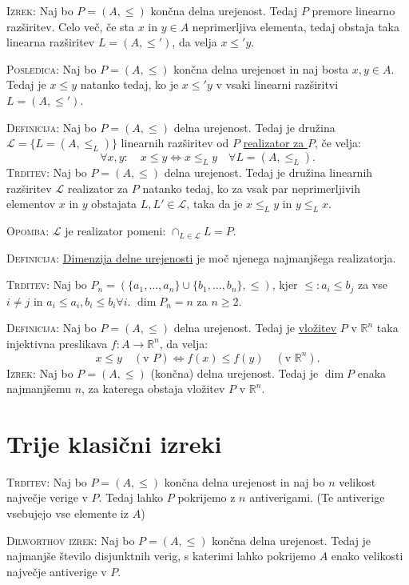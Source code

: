 \documentclass[8pt,a4paper]{amsart}
\theoremstyle{definition} %
\theoremstyle{plain} %
\newcommand{\R}{\mathbb R}
\begin{document}
\textsc{Izrek:} Naj bo $P=(A,\leq)$ končna delna urejenost. Tedaj $P$ premore linearno razširitev. Celo več, če sta $x$ in $y\in A$ neprimerljiva elementa, tedaj obstaja taka linearna razširitev $L=(A,\leq')$, da velja $x \leq' y$.

\textsc{Posledica:} Naj bo $P=(A,\leq )$ končna delna urejenost in naj bosta $x,y\in A$. Tedaj je $x\leq y$ natanko tedaj, ko je $x \leq' y$ v vsaki linearni razširitvi $L=(A,\leq')$.

\textsc{Definicija:} Naj bo $P=(A,\leq )$ delna urejenost. Tedaj je družina $\mathcal{L} = \{ L=(A,\leq_L) \}$ linearnih razširitev od $P$ \underline{realizator za $P$}, če velja:
$$
\forall x,y:\quad  x \leq y \Longleftrightarrow x \leq_L y \quad \forall L=(A,\leq_L).
$$
\textsc{Trditev:} Naj bo $P=(A,\leq)$ delna urejenost. Tedaj je družina linearnih razširitev $\mathcal{L}$ realizator za $P$ natanko tedaj, ko za vsak par neprimerljivih elementov $x$ in $y$ obstajata $L, L' \in \mathcal{L}$, taka da je $x \leq_L y$ in $y \leq_L x$.

\textsc{Opomba:} $\mathcal{L}$ je realizator pomeni: $\cap_{L \in \mathcal{L}}L = P$.

\textsc{Definicija:} \underline{Dimenzija delne urejenosti} je moč njenega najmanjšega realizatorja.

\textsc{Trditev:} Naj bo $P_n = (\{ a_1,\ldots ,a_n\} \cup \{b_1, \ldots ,b_n \},\leq)$, kjer $\leq: a_i \leq b_j$ za vse $i \neq j$ in $a_i \leq a_i, b_i \leq b_i \forall i$. $\dim{P_n}=n$ za $n \geq 2$.

\textsc{Definicija:} Naj bo $P=(A,\leq )$ delna urejenost. Tedaj je \underline{vložitev} $P$ v $\R^n$ taka injektivna preslikava $f: A \longrightarrow \R^n $, da velja:
$$
x \leq y \quad (\text{v } P) \Longleftrightarrow f(x) \leq f(y) \quad (\text{v } \R^n).
$$
\textsc{Izrek:} Naj bo $P=(A,\leq)$ (končna) delna urejenost. Tedaj je $\dim{P}$ enaka najmanjšemu $n$, za katerega obstaja vložitev $P$ v $\R^n$.

\section{Trije klasični izreki}

\textsc{Trditev:} Naj bo $P=(A,\leq)$ končna delna urejenost in naj bo $n$ velikost največje verige v $P$. Tedaj lahko $P$ pokrijemo z $n$ antiverigami. (Te antiverige vsebujejo vse elemente iz $A$)

\textsc{Dilworthov izrek:} Naj bo $P=(A,\leq)$ končna delna urejenost. Tedaj je najmanjše število disjunktnih verig, s katerimi lahko pokrijemo $A$ enako velikosti največje antiverige v $P$.
\end{document}
